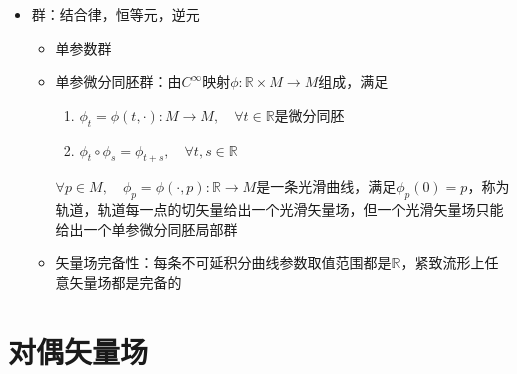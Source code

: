 \begin{itemize}
\begin{itemize}
    \end{itemize}
    \item 群：结合律，恒等元，逆元
    \begin{itemize}
        \item 单参数群
        \item 单参微分同胚群：由$C^{\infty}$映射$\phi:\mathbb{R} \times M \to M$组成，满足
        \begin{enumerate}
            \item $\phi_t=\phi(t,\cdot):M \to M,\quad\forall t \in \mathbb{R}$是微分同胚
            \item $\phi_t \circ \phi_s=\phi_{t+s},\quad \forall t,s \in \mathbb{R}$
        \end{enumerate}
        $\forall p \in M,\quad \phi_p=\phi(\cdot,p):\mathbb{R} \to M$是一条光滑曲线，满足$\phi_p(0)=p$，称为轨道，轨道每一点的切矢量给出一个光滑矢量场，但一个光滑矢量场只能给出一个单参微分同胚局部群
        \item 矢量场完备性：每条不可延积分曲线参数取值范围都是$\mathbb{R}$，紧致流形上任意矢量场都是完备的
    \end{itemize}
\end{itemize}

\section{对偶矢量场}

